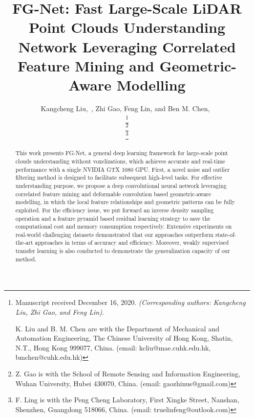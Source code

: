\documentclass[journal]{IEEEtran}
\begin{document}
\title{FG-Net: Fast Large-Scale LiDAR Point Clouds Understanding Network Leveraging Correlated Feature Mining and Geometric-Aware Modelling}


\author{Kangcheng Liu,~, Zhi Gao, Feng Lin, and Ben M. Chen,~
        
\thanks{Manuscript received December 16, 2020.  \textit{(Corresponding authors: Kangcheng Liu, Zhi Gao, and Feng Lin)}. 

K. Liu and B. M. Chen are with the Department of Mechanical and Automation Engineering, The Chinese University of Hong Kong, Shatin, N.T.,  Hong Kong 999077, China.
(email: kcliu@mae.cuhk.edu.hk, bmchen@cuhk.edu.hk)}



\thanks{Z. Gao is with the School of Remote Sensing and Information Engineering, Wuhan University, Hubei 430070, China.
(email: gaozhinus@gmail.com)}


\thanks{F. Ling is with the Peng Cheng Laboratory, First Xingke Street, Nanshan, Shenzhen, Guangdong 518066, China.
(email: truelinfeng@outlook.com)}
}   

        






















\maketitle



\begin{abstract}
This work presents FG-Net, a general deep learning framework for large-scale point clouds understanding without voxelizations, which achieves accurate and real-time performance with a single NVIDIA GTX 1080 GPU. First, a novel noise and outlier filtering method is designed to facilitate subsequent high-level tasks. For effective understanding purpose, we propose a deep convolutional neural network leveraging correlated feature mining and deformable convolution based geometric-aware modelling, in which the local feature relationships and geometric patterns can be fully exploited. For the efficiency issue, we put forward an inverse density sampling operation and a feature pyramid based residual learning strategy to save the computational cost and memory consumption respectively. Extensive experiments on real-world challenging datasets demonstrated that our approaches outperform state-of-the-art approaches in terms of accuracy and efficiency. Moreover, weakly supervised transfer learning is also conducted to demonstrate the generalization capacity of our method. 
\end{abstract}
\end{document}
